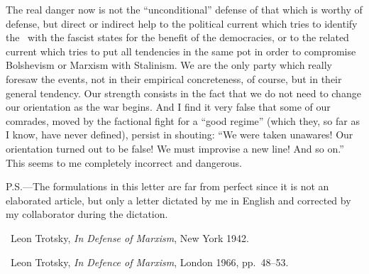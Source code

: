 The real danger now is not the “unconditional” defense of that which is worthy of defense, but direct or indirect help to the political current which tries to identify the \USSR\ with the fascist states for the benefit of the democracies, or to the related current which tries to put all tendencies in the same pot in order to compromise Bolshevism or Marxism with Stalinism. We are the only party which really foresaw the events, not in their empirical concreteness, of course, but in their general tendency. Our strength consists in the fact that we do not need to change our orientation as the war begins. And I find it very false that some of our comrades, moved by the factional fight for a “good regime” (which they, so far as I know, have never defined), persist in shouting: “We were taken unawares! Our orientation turned out to be false! We must improvise a new line! And so on.” This seems to me completely incorrect and dangerous.



\begin{postscriptum}
  P.S.---The formulations in this letter are far from perfect since it is not an elaborated article, but only a letter dictated by me in English and corrected by my collaborator during the dictation.
\end{postscriptum}


\begin{letterinfo}
  \firstpublished\ Leon Trotsky, \emph{In Defense of Marxism}, New York 1942.
  
  \checkedagainst\ Leon Trotsky, \emph{In Defence of Marxism}, London 1966, pp.~48--53.
  
  \footnoteslatter
\end{letterinfo}